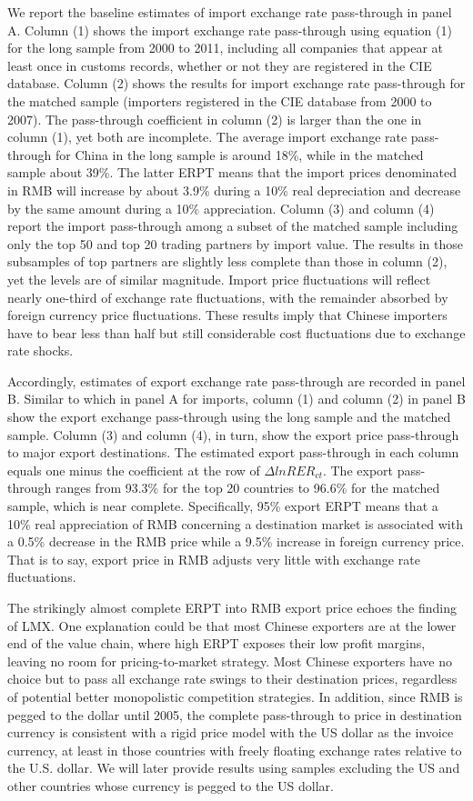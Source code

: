 We report the baseline estimates of import exchange rate pass-through in panel A. Column (1) shows the import exchange rate pass-through using equation (1) for the long sample from 2000 to 2011, including all companies that appear at least once in customs records, whether or not they are registered in the CIE database. Column (2) shows the results for import exchange rate pass-through for the matched sample (importers registered in the CIE database from 2000 to 2007). The pass-through coefficient in column (2) is larger than the one in column (1), yet both are incomplete. The average import exchange rate pass-through for China in the long sample is around 18\%, while in the matched sample about 39\%. The latter ERPT means that the import prices denominated in RMB will increase by about 3.9\% during a 10\% real depreciation and decrease by the same amount during a 10\% appreciation. Column (3) and column (4) report the import pass-through among a subset of the matched sample including only the top 50 and top 20 trading partners by import value. The results in those subsamples of top partners are slightly less complete than those in column (2), yet the levels are of similar magnitude. Import price fluctuations will reflect nearly one-third of exchange rate fluctuations, with the remainder absorbed by foreign currency price fluctuations. These results imply that Chinese importers have to bear less than half but still considerable cost fluctuations due to exchange rate shocks. 

Accordingly, estimates of export exchange rate pass-through are recorded in panel B. Similar to which in panel A for imports, column (1) and column (2) in panel B show the export exchange pass-through using the long sample and the matched sample. Column (3) and column (4), in turn, show the export price pass-through to major export destinations. The estimated export pass-through in each column equals one minus the coefficient at the row of $\Delta lnRER_{ct}$. The export pass-through ranges from 93.3\% for the top 20 countries to 96.6\% for the matched sample, which is near complete. Specifically, 95\% export ERPT means that a 10\% real appreciation of RMB concerning a destination market is associated with a 0.5\% decrease in the RMB price while a 9.5\% increase in foreign currency price. That is to say, export price in RMB adjusts very little with exchange rate fluctuations.

The strikingly almost complete ERPT into RMB export price echoes the finding of LMX\cite{lmx2015}. One explanation could be that most Chinese exporters are at the lower end of the value chain, where high ERPT exposes their low profit margins, leaving no room for pricing-to-market strategy. Most Chinese exporters have no choice but to pass all exchange rate swings to their destination prices, regardless of potential better monopolistic competition strategies. In addition, since RMB is pegged to the dollar until 2005, the complete pass-through to price in destination currency is consistent with a rigid price model with the US dollar as the invoice currency, at least in those countries with freely floating exchange rates relative to the U.S. dollar. We will later provide results using samples excluding the US and other countries whose currency is pegged to the US dollar.


